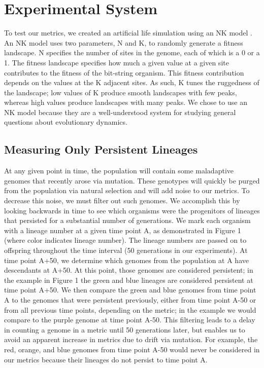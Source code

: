 \documentclass[letterpaper]{article}
\begin{document}
\section{Experimental System}
    To test our metrics, we created an artificial life simulation using an NK model \citep{kauffman_towards_1987}. An NK model uses two parameters, N and K, to randomly generate a fitness landscape. N specifies the number of sites in the genome, each of which is a 0 or a 1. The fitness landscape specifies how much a given value at a given site contributes to the fitness of the bit-string organism. This fitness contribution depends on the values at the K adjacent sites. As such, K tunes the ruggedness of the landscape; low values of K produce smooth landscapes with few peaks, whereas high values produce landscapes with many peaks. We chose to use an NK model because they are a well-understood system for studying general questions about evolutionary dynamics.

\subsection{Measuring Only Persistent Lineages}
    At any given point in time, the population will contain some maladaptive genomes that recently arose via mutation. These genotypes will quickly be purged from the population via natural selection and will add noise to our metrics. To decrease this noise, we must filter out such genomes. We accomplish this by looking backwards in time to see which organisms were the progenitors of lineages that persisted for a substantial number of generations. We mark each organism with a lineage number at a given time point A, as demonstrated in Figure 1 (where color indicates lineage number). The lineage numbers are passed on to offspring throughout the time interval (50 generations in our experiments). At time point A+50, we determine which genomes from the population at A have descendants at A+50. At this point, those genomes are considered persistent; in the example in Figure 1 the green and blue lineages are considered persistent at time point A+50. We then compare the green and blue genomes from time point A to the genomes that were persistent previously, either from time point A-50 or from all previous time points, depending on the metric; in the example we would compare to the purple genome at time point A-50. This filtering leads to a delay in counting a genome in a metric until 50 generations later, but enables us to avoid an apparent increase in metrics due to drift via mutation. For example, the red, orange, and blue genomes from time point A-50 would never be considered in our metrics because their lineages do not persist to time point A.
\end{document}
